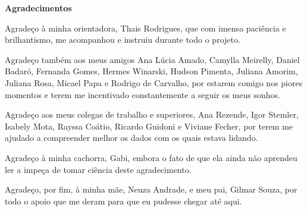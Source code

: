 \documentclass[12pt, a4paper, twoside]{article}
\numberwithin{equation}{subsection} %
\begin{document}


\vspace*{2.5cm}

\begin{center}
 {\Huge \bfseries Agradecimentos}
\end{center}
\baselineskip 19.5pt 
\vspace*{1.5cm}

Agradeço à minha orientadora, Thais Rodrigues, que com imensa paciência e brilhantismo, me acompanhou e instruiu durante todo o projeto.

Agradeço também aos meus amigos Ana Lúcia Amado, Camylla Meirelly, Daniel Badaró, Fernanda Gomes, Hermes Winarski, Hudson Pimenta, Juliana Amorim, Juliana Rosa, Micael Papa e Rodrigo de Carvalho, por estarem comigo nos piores momentos e terem me incentivado constantemente a seguir os meus sonhos.

Agradeço aos meus colegas de trabalho e superiores, Ana Rezende, Igor Stemler, Isabely Mota, Rayssa Coátio, Ricardo Guidoni e Viviane Fecher, por terem me ajudado a compreender melhor os dados com os quais estava lidando. 

Agradeço à minha cachorra, Gabi, embora o fato de que ela ainda não aprendeu ler a impeça de tomar ciência deste agradecimento.

Agradeço, por fim, à minha mãe, Neuza Andrade, e meu pai, Gilmar Souza, por todo o apoio que me deram para que eu pudesse chegar até aqui.
\newpage


%
%
%
\end{document}
